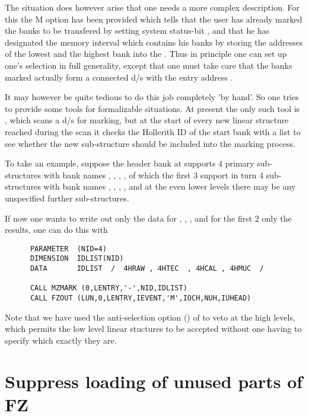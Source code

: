 The situation does however arise that one needs a more
complex description.
For this the M option has been provided which tells 
that the user has already marked the banks to be transfered
by setting system status-bit ,
and that he has designated the memory interval which contains
his banks by storing the addresses of the lowest and the highest
bank into the .
Thus in principle one can set up one's selection in full
generality,
except that one must take care that the banks marked
actually form a connected d/s with the entry address .

It may however be quite tedious to do this job completely
'by hand'.
So one tries to provide some tools for formalizable situations.
At present the only such tool is ,
which scans a d/s for marking,
but at the start of every new linear structure reached during
the scan it checks the Hollerith ID of the start bank
with a list to see whether the new sub-structure should
be included into the marking process.

To take an example, suppose the header bank at 
supports 4 primary sub-structures with bank names
, , , , of which the first 3 support in turn
4 sub-structures with bank names , , , ,
and at the even lower levels there may be any unspecified further
sub-structures.

If now one wants to write out only the data for , , ,
and for the first 2 only the  results,
one can do this with

\begin{verbatim}
      PARAMETER  (NID=4)
      DIMENSION  IDLIST(NID)
      DATA       IDLIST  /  4HRAW , 4HTEC  , 4HCAL , 4HMUC  /

      CALL MZMARK (0,LENTRY,'-',NID,IDLIST)
      CALL FZOUT (LUN,0,LENTRY,IEVENT,'M',IOCH,NUH,IUHEAD)
\end{verbatim}

Note that we have used the anti-selection option (\Lit{-}) of 
to veto at the high levels,
which permits the low level linear stuctures to be accepted without
one having to specify which exactly they are.

\section{Suppress loading of unused parts of FZ}

